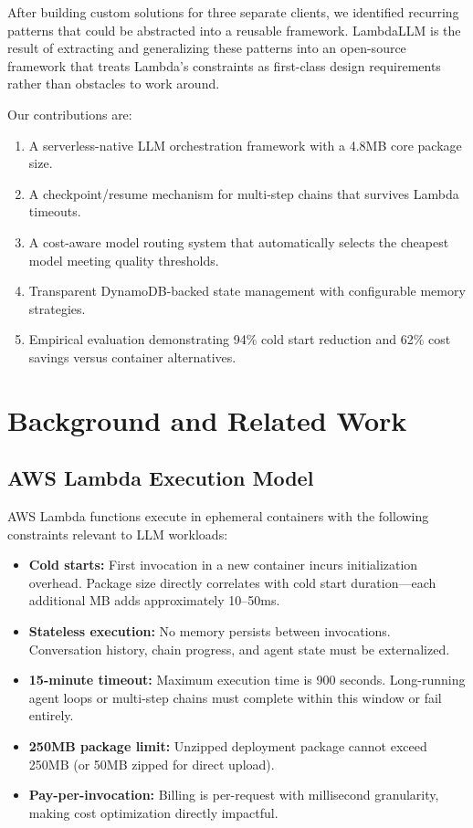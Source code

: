 \documentclass[10pt,twocolumn,letterpaper]{article}
\begin{document}
After building custom solutions for three separate clients, we identified recurring patterns that could be abstracted into a reusable framework. LambdaLLM is the result of extracting and generalizing these patterns into an open-source framework that treats Lambda's constraints as first-class design requirements rather than obstacles to work around.

Our contributions are:
\begin{enumerate}[leftmargin=*,itemsep=2pt,topsep=2pt]
    \item A serverless-native LLM orchestration framework with a 4.8MB core package size.
    \item A checkpoint/resume mechanism for multi-step chains that survives Lambda timeouts.
    \item A cost-aware model routing system that automatically selects the cheapest model meeting quality thresholds.
    \item Transparent DynamoDB-backed state management with configurable memory strategies.
    \item Empirical evaluation demonstrating 94\% cold start reduction and 62\% cost savings versus container alternatives.
\end{enumerate}

\section{Background and Related Work}

\subsection{AWS Lambda Execution Model}

AWS Lambda functions execute in ephemeral containers with the following constraints relevant to LLM workloads:

\begin{itemize}[leftmargin=*,itemsep=2pt,topsep=2pt]
    \item \textbf{Cold starts:} First invocation in a new container incurs initialization overhead. Package size directly correlates with cold start duration---each additional MB adds approximately 10--50ms.
    \item \textbf{Stateless execution:} No memory persists between invocations. Conversation history, chain progress, and agent state must be externalized.
    \item \textbf{15-minute timeout:} Maximum execution time is 900 seconds. Long-running agent loops or multi-step chains must complete within this window or fail entirely.
    \item \textbf{250MB package limit:} Unzipped deployment package cannot exceed 250MB (or 50MB zipped for direct upload).
    \item \textbf{Pay-per-invocation:} Billing is per-request with millisecond granularity, making cost optimization directly impactful.
\end{itemize}
\end{document}
